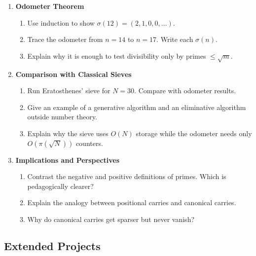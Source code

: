 \documentclass[11pt]{article}
\theoremstyle{definition}
\begin{document}
\begin{enumerate}[label=\textbf{Set \#\arabic*:}, leftmargin=*]
  \item \textbf{Odometer Theorem}
  \begin{enumerate}
    \item Use induction to show $\sigma(12)=(2,1,0,0,\dots)$.  
    \item Trace the odometer from $n=14$ to $n=17$. Write each $\sigma(n)$.  
    \item Explain why it is enough to test divisibility only by primes $\leq \sqrt{m}$.  
  \end{enumerate}

  \item \textbf{Comparison with Classical Sieves}
  \begin{enumerate}
    \item Run Eratosthenes’ sieve for $N=30$. Compare with odometer results.  
    \item Give an example of a generative algorithm and an eliminative algorithm outside number theory.  
    \item Explain why the sieve uses $O(N)$ storage while the odometer needs only $O(\pi(\sqrt{N}))$ counters.  
  \end{enumerate}

  \item \textbf{Implications and Perspectives}
  \begin{enumerate}
    \item Contrast the negative and positive definitions of primes. Which is pedagogically clearer?  
    \item Explain the analogy between positional carries and canonical carries.  
    \item Why do canonical carries get sparser but never vanish?  
  \end{enumerate}

\end{enumerate}

\subsection{Extended Projects}
\end{document}
